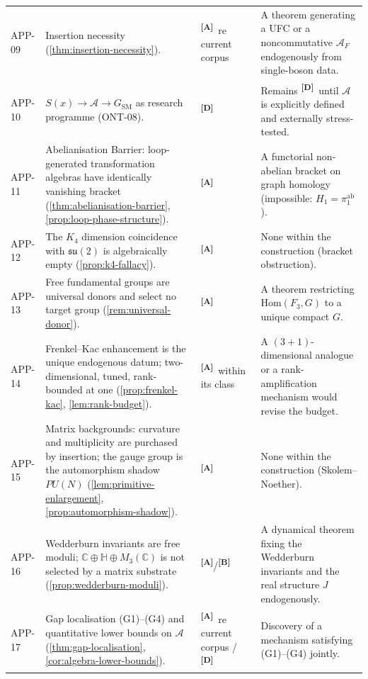 \documentclass[12pt,a4paper,twoside]{article}
\theoremstyle{plain}
\theoremstyle{definition}
\theoremstyle{remark}
\newcommand{\catmark}[1]{\textsuperscript{\textsf{\textbf{[#1]}}}}
\begin{document}
\begin{longtable}{p{} p{} p{} p{}}
APP-09 & Insertion necessity (\cref{thm:insertion-necessity}). & \catmark{A}\ re current corpus & A theorem generating a UFC or a noncommutative $\mathcal{A}_F$ endogenously from single-boson data. \\
APP-10 & $S(x)\to\mathcal{A}\to G_{\mathrm{SM}}$ as research programme (ONT-08). & \catmark{D} & Remains \catmark{D}\ until $\mathcal{A}$ is explicitly defined and externally stress-tested. \\
APP-11 & Abelianisation Barrier: loop-generated transformation algebras have identically vanishing bracket (\cref{thm:abelianisation-barrier}, \cref{prop:loop-phase-structure}). & \catmark{A} & A functorial non-abelian bracket on graph homology (impossible: $H_1=\pi_1^{\mathrm{ab}}$). \\
APP-12 & The $K_4$ dimension coincidence with $\mathfrak{su}(2)$ is algebraically empty (\cref{prop:k4-fallacy}). & \catmark{A} & None within the construction (bracket obstruction). \\
APP-13 & Free fundamental groups are universal donors and select no target group (\cref{rem:universal-donor}). & \catmark{A} & A theorem restricting $\mathrm{Hom}(F_3,G)$ to a unique compact $G$. \\
APP-14 & Frenkel--Kac enhancement is the unique endogenous datum; two-dimensional, tuned, rank-bounded at one (\cref{prop:frenkel-kac}, \cref{lem:rank-budget}). & \catmark{A}\ within its class & A $(3{+}1)$-dimensional analogue or a rank-amplification mechanism would revise the budget. \\
APP-15 & Matrix backgrounds: curvature and multiplicity are purchased by insertion; the gauge group is the automorphism shadow $PU(N)$ (\cref{lem:primitive-enlargement}, \cref{prop:automorphism-shadow}). & \catmark{A} & None within the construction (Skolem--Noether). \\
APP-16 & Wedderburn invariants are free moduli; $\mathbb{C}\oplus\mathbb{H}\oplus M_3(\mathbb{C})$ is not selected by a matrix substrate (\cref{prop:wedderburn-moduli}). & \catmark{A}/\catmark{B} & A dynamical theorem fixing the Wedderburn invariants and the real structure $J$ endogenously. \\
APP-17 & Gap localisation (G1)--(G4) and quantitative lower bounds on $\mathcal{A}$ (\cref{thm:gap-localisation}, \cref{cor:algebra-lower-bounds}). & \catmark{A}\ re current corpus / \catmark{D} & Discovery of a mechanism satisfying (G1)--(G4) jointly. \\
\bottomrule
\end{longtable}
\end{document}
